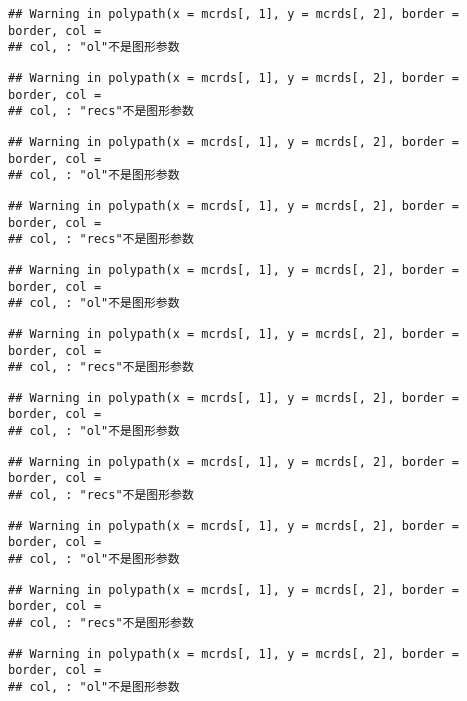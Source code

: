 \documentclass[]{article}
\begin{document}
\begin{verbatim}
## Warning in polypath(x = mcrds[, 1], y = mcrds[, 2], border = border, col =
## col, : "ol"不是图形参数
\end{verbatim}

\begin{verbatim}
## Warning in polypath(x = mcrds[, 1], y = mcrds[, 2], border = border, col =
## col, : "recs"不是图形参数
\end{verbatim}

\begin{verbatim}
## Warning in polypath(x = mcrds[, 1], y = mcrds[, 2], border = border, col =
## col, : "ol"不是图形参数
\end{verbatim}

\begin{verbatim}
## Warning in polypath(x = mcrds[, 1], y = mcrds[, 2], border = border, col =
## col, : "recs"不是图形参数
\end{verbatim}

\begin{verbatim}
## Warning in polypath(x = mcrds[, 1], y = mcrds[, 2], border = border, col =
## col, : "ol"不是图形参数
\end{verbatim}

\begin{verbatim}
## Warning in polypath(x = mcrds[, 1], y = mcrds[, 2], border = border, col =
## col, : "recs"不是图形参数
\end{verbatim}

\begin{verbatim}
## Warning in polypath(x = mcrds[, 1], y = mcrds[, 2], border = border, col =
## col, : "ol"不是图形参数
\end{verbatim}

\begin{verbatim}
## Warning in polypath(x = mcrds[, 1], y = mcrds[, 2], border = border, col =
## col, : "recs"不是图形参数
\end{verbatim}

\begin{verbatim}
## Warning in polypath(x = mcrds[, 1], y = mcrds[, 2], border = border, col =
## col, : "ol"不是图形参数
\end{verbatim}

\begin{verbatim}
## Warning in polypath(x = mcrds[, 1], y = mcrds[, 2], border = border, col =
## col, : "recs"不是图形参数
\end{verbatim}

\begin{verbatim}
## Warning in polypath(x = mcrds[, 1], y = mcrds[, 2], border = border, col =
## col, : "ol"不是图形参数
\end{verbatim}
\end{document}
